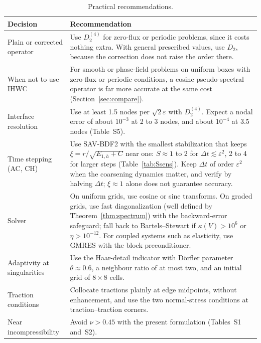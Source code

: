\documentclass[preprint,12pt]{elsarticle}
\theoremstyle{remark}
\begin{document}
\begin{table}[t]\centering\small
\caption{Practical recommendations.}\label{tab:guide}
\begin{tabular}{p{3.3cm}p{10.6cm}}
\toprule
Decision & Recommendation\\
\midrule
Plain or corrected operator & Use $D_2^{(4)}$ for zero-flux or periodic problems, since it costs nothing extra. With general prescribed values, use $D_2$, because the correction does not raise the order there.\\
When not to use IHWC & For smooth or phase-field problems on uniform boxes with zero-flux or periodic conditions, a cosine pseudo-spectral operator is far more accurate at the same cost (Section~\ref{sec:compare}).\\
Interface resolution & Use at least 1.5 nodes per $\sqrt2\varepsilon$ with $D_2^{(4)}$. Expect a nodal error of about $10^{-3}$ at 2 to 3 nodes, and about $10^{-4}$ at 3.5 nodes (Table~S5).\\
Time stepping (AC, CH) & Use SAV-BDF2 with the smallest stabilization that keeps $\xi=r/\sqrt{E_{1,h}+C}$ near one: $S\approx1$ to 2 for $\Delta t\lesssim\varepsilon^2$, 2 to 4 for larger steps (Table~\ref{tab:Ssens}). Keep $\Delta t$ of order $\varepsilon^2$ when the coarsening dynamics matter, and verify by halving $\Delta t$; $\xi\approx1$ alone does not guarantee accuracy.\\
Solver & On uniform grids, use cosine or sine transforms. On graded grids, use fast diagonalization (well defined by Theorem~\ref{thm:spectrum}) with the backward-error safeguard; fall back to Bartels--Stewart if $\kappa(V)>10^6$ or $\eta>10^{-12}$. For coupled systems such as elasticity, use GMRES with the block preconditioner.\\
Adaptivity at singularities & Use the Haar-detail indicator with D\"orfler parameter $\theta\approx0.6$, a neighbour ratio of at most two, and an initial grid of $8\times8$ cells.\\
Traction conditions & Collocate tractions plainly at edge midpoints, without enhancement, and use the two normal-stress conditions at traction--traction corners.\\
Near incompressibility & Avoid $\nu>0.45$ with the present formulation (Tables~S1 and~S2).\\
\bottomrule
\end{tabular}
\end{table}

\end{document}
